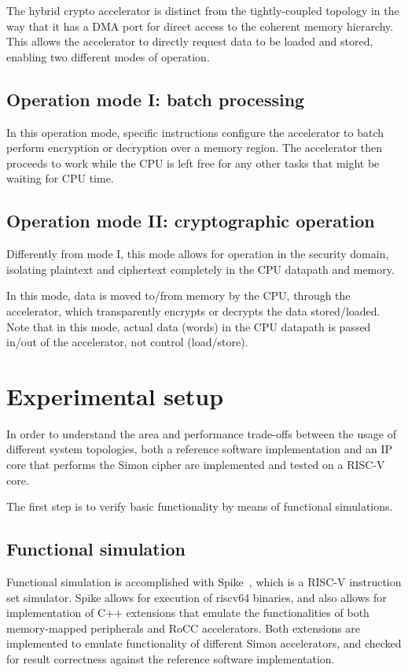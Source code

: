 \documentclass[10pt,conference]{IEEEtran}
\begin{document}
The hybrid crypto accelerator is distinct from the tightly-coupled topology in
the way that it has a DMA port for direct access to the coherent memory
hierarchy. This allows the accelerator to directly request data to be loaded and
stored, enabling two different modes of operation.

\subsection{Operation mode I: batch processing}

In this operation mode, specific instructions configure the accelerator to
batch perform encryption or decryption over a memory region. The accelerator
then proceeds to work while the CPU is left free for any other tasks that might
be waiting for CPU time.


\subsection{Operation mode II: cryptographic operation}

Differently from mode I, this mode allows for operation in the security domain,
isolating plaintext and ciphertext completely in the CPU datapath and memory.

In this mode, data is moved to/from memory by the CPU, through the accelerator,
which transparently encrypts or decrypts the data stored/loaded. Note that in
this mode, actual data (words) in the CPU datapath is passed in/out of the
accelerator, not control (load/store).

\section{Experimental setup}

In order to understand the area and performance trade-offs between the usage of
different system topologies, both a reference software implementation and an IP
core that performs the Simon cipher are implemented and tested on a RISC-V core.

The first step is to verify basic functionality by means of functional simulations.

\subsection{Functional simulation}

Functional simulation is accomplished with Spike~\cite{spike}, which is a RISC-V
instruction set simulator. Spike allows for execution of riscv64 binaries, and
also allows for implementation of C++ extensions that emulate the
functionalities of both memory-mapped peripherals and RoCC accelerators. Both
extensions are implemented to emulate functionality of different Simon
accelerators, and checked for result correctness against the reference software
implementation.
\end{document}
